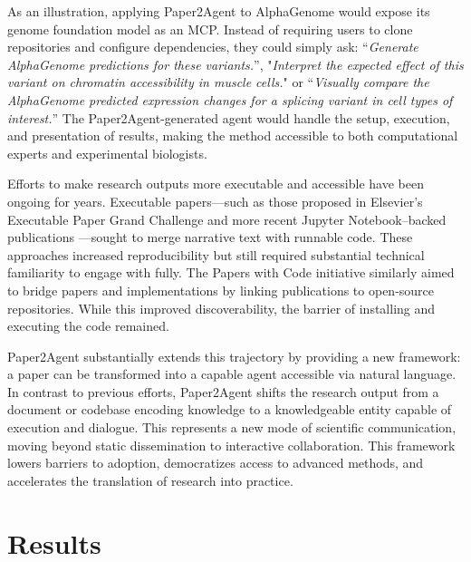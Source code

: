 \documentclass[11pt]{article}
\begin{document}
As an illustration, applying Paper2Agent to AlphaGenome would expose its genome foundation model as an MCP. Instead of requiring users to clone repositories and configure dependencies, they could simply ask: “\textit{Generate AlphaGenome predictions for these variants.}”, "\textit{Interpret the expected effect of this variant on chromatin accessibility in muscle cells.}" or “\textit{Visually compare the AlphaGenome predicted expression changes for a splicing variant in cell types of interest.}” The Paper2Agent-generated agent would handle the setup, execution, and presentation of results, making the method accessible to both computational experts and experimental biologists.

Efforts to make research outputs more executable and accessible have been ongoing for years. Executable papers—such as those proposed in Elsevier’s Executable Paper Grand Challenge \citep{nowakowski2011collage} and more recent Jupyter Notebook–backed publications \citep{rule2019ten}—sought to merge narrative text with runnable code. These approaches increased reproducibility but still required substantial technical familiarity to engage with fully. The Papers with Code initiative \citep{stojnic2019paperswithcode} similarly aimed to bridge papers and implementations by linking publications to open-source repositories. While this improved discoverability, the barrier of installing and executing the code remained.

 Paper2Agent substantially extends this trajectory by providing a new framework: a paper can  be transformed into a capable agent accessible via natural language. In contrast to previous efforts, Paper2Agent shifts the research output from a document or codebase encoding knowledge to a knowledgeable entity capable of execution and dialogue. This represents a new mode of scientific communication, moving beyond static dissemination to interactive collaboration.
 This framework lowers barriers to adoption, democratizes access to advanced methods, and accelerates the translation of research into practice. %


\section{Results}
\end{document}
